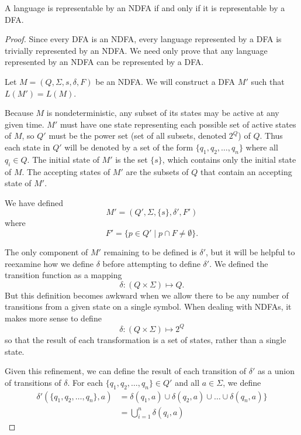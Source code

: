 \documentclass{bcthesis}
\begin{document}
	\begin{claim}
	\label{prop:ndfa_dfa_equivalent}
		A language is representable by an NDFA if and only if it is representable by a DFA.
	\end{claim}
	\begin{proof}
	\label{proof:ndfa_dfa_equivalent}
		Since every DFA is an NDFA, every language represented by a DFA is trivially represented by an NDFA.
		We need only prove that any language represented by an NDFA can be represented by a DFA.

		Let $M = (Q, \Sigma, s, \delta, F)$ be an NDFA.
		We will construct a DFA $M'$ such that $L(M') = L(M)$.

		Because $M$ is nondeterministic, any subset of its states may be active at any given time.
		$M'$ must have one state representing each possible set of active states of $M$, so $Q'$ must be the power set (set of all subsets, denoted $2^Q$) of $Q$.
		Thus each state in $Q'$ will be denoted by a set of the form $\{ q_1, q_2, \dots, q_n \}$ where all $q_i \in Q$.
		The initial state of $M'$ is the set $\{ s \}$, which contains only the initial state of $M$.
		The accepting states of $M'$ are the subsets of $Q$ that contain an accepting state of $M'$.

		We have defined
		\[
			M' = (Q', \Sigma, \{s\}, \delta', F')
		\]
		where
		\[
			F' = \{ p \in Q' \mid p \cap F \neq \emptyset\}.
		\]

		The only component of $M'$ remaining to be defined is $\delta'$, but it will be helpful to reexamine how we define $\delta$ before attempting to define $\delta'$.
		We defined the transition function as a mapping 
		\[
			\delta : (Q \times \Sigma) \mapsto Q.
		\]
		But this definition becomes awkward when we allow there to be any number of transitions from a given state on a single symbol.
		When dealing with NDFAs, it makes more sense to define
		\[
			\delta : (Q \times \Sigma) \mapsto 2^Q
		\]
		so that the result of each transformation is a set of states, rather than a single state.

		Given this refinement, we can define the result of each transition of $\delta'$ as a union of transitions of $\delta$.
		For each $\{ q_1, q_2, \dots, q_n \} \in Q'$ and all $a \in \Sigma$, we define
		\begin{align*}
			\delta'(\{ q_1, q_2, \dots, q_n \}, a) &= \delta(q_1, a) \cup \delta(q_2, a) \cup \dots \cup \delta(q_n, a) \} \\
			&= \bigcup_{i=1}^n \delta(q_i, a)
		\end{align*}
		

\end{proof}
\end{document}
